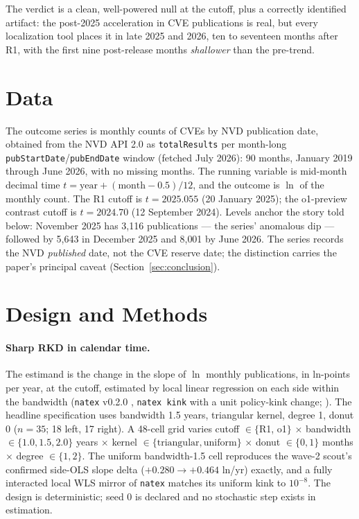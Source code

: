 \documentclass[11pt]{article}
\newcommand{\natex}{\texttt{natex}}
\begin{document}
The verdict is a clean, well-powered null at the cutoff, plus a correctly
identified artifact: the post-2025 acceleration in CVE publications is real,
but every localization tool places it in late 2025 and 2026, ten to
seventeen months after R1, with the first nine post-release months
\emph{shallower} than the pre-trend.

\section{Data}\label{sec:data}

The outcome series is monthly counts of CVEs by NVD publication date,
obtained from the NVD API 2.0 \cite{nvd} as \texttt{totalResults} per
month-long \texttt{pubStartDate}/\texttt{pubEndDate} window (fetched July
2026): 90 months, January 2019 through June 2026, with no missing months.
The running variable is mid-month decimal time $t = \text{year} +
(\text{month}-0.5)/12$, and the outcome is $\ln$ of the monthly count. The
R1 cutoff is $t=2025.055$ (20 January 2025); the o1-preview contrast cutoff
is $t=2024.70$ (12 September 2024). Levels anchor the story told below:
November 2025 has 3{,}116 publications --- the series' anomalous dip ---
followed by 5{,}643 in December 2025 and 8{,}001 by June 2026. The series
records the NVD \emph{published} date, not the CVE reserve date; the
distinction carries the paper's principal caveat
(Section~\ref{sec:conclusion}).

\section{Design and Methods}\label{sec:methods}

\paragraph{Sharp RKD in calendar time.} The estimand is the change in the
slope of $\ln$ monthly publications, in ln-points per year, at the cutoff,
estimated by local linear regression on each side within the bandwidth
(\natex{} v0.2.0 \cite{natex}, \texttt{natex kink} with a unit policy-kink
change; \cite{card2015,bockerman2025}). The headline specification uses
bandwidth 1.5 years, triangular kernel, degree 1, donut 0 ($n=35$; 18 left,
17 right). A 48-cell grid varies cutoff $\in\{$R1, o1$\}$ $\times$ bandwidth
$\in\{1.0, 1.5, 2.0\}$ years $\times$ kernel
$\in\{\text{triangular},\text{uniform}\}$ $\times$ donut $\in\{0, 1\}$
months $\times$ degree $\in\{1,2\}$. The uniform bandwidth-1.5 cell
reproduces the wave-2 scout's confirmed side-OLS slope delta
($+0.280\rightarrow+0.464$ ln/yr) exactly, and a fully interacted local WLS
mirror of \natex{} matches its uniform kink to $10^{-8}$. The design is
deterministic; seed 0 is declared and no stochastic step exists in
estimation.
\end{document}
